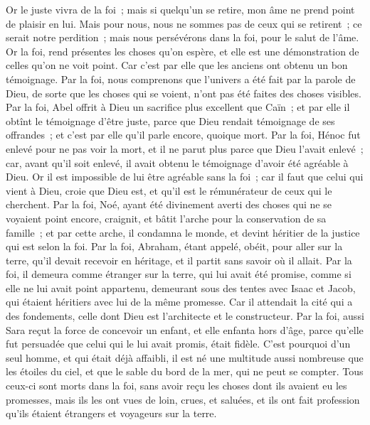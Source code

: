 \begin{multicols}{2}
Or le juste vivra de la foi~; mais si quelqu'un se retire, mon âme ne prend point de plaisir en lui.
Mais pour nous, nous ne sommes pas de ceux qui se retirent~; ce serait notre perdition~; mais nous persévérons dans la foi, pour le salut de l'âme.
\VerseOne{}Or la foi, rend présentes les choses qu'on espère, et elle est une démonstration de celles qu'on ne voit point.
Car c'est par elle que les anciens ont obtenu un bon témoignage.
Par la foi, nous comprenons que l'univers a été fait par la parole de Dieu, de sorte que les choses qui se voient, n'ont pas été faites des choses visibles.
Par la foi, Abel offrit à Dieu un sacrifice plus excellent que Caïn~; et par elle il obtînt le témoignage d'être juste, parce que Dieu rendait témoignage de ses offrandes~; et c'est par elle qu'il parle encore, quoique mort.
Par la foi, Hénoc fut enlevé pour ne pas voir la mort, et il ne parut plus parce que Dieu l'avait enlevé~; car, avant qu'il soit enlevé, il avait obtenu le témoignage d'avoir été agréable à Dieu.
Or il est impossible de lui être agréable sans la foi~; car il faut que celui qui vient à Dieu, croie que Dieu est, et qu'il est le rémunérateur de ceux qui le cherchent.
Par la foi, Noé, ayant été divinement averti des choses qui ne se voyaient point encore, craignit, et bâtit l'arche pour la conservation de sa famille~; et par cette arche, il condamna le monde, et devint héritier de la justice qui est selon la foi.
Par la foi, Abraham, étant appelé, obéit, pour aller sur la terre, qu'il devait recevoir en héritage, et il partit sans savoir où il allait.
Par la foi, il demeura comme étranger sur la terre, qui lui avait été promise, comme si elle ne lui avait point appartenu, demeurant sous des tentes avec Isaac et Jacob, qui étaient héritiers avec lui de la même promesse.
Car il attendait la cité qui a des fondements, celle dont Dieu est l'architecte et le constructeur.
Par la foi, aussi Sara reçut la force de concevoir un enfant, et elle enfanta hors d'âge, parce qu'elle fut persuadée que celui qui le lui avait promis, était fidèle.
C'est pourquoi d'un seul homme, et qui était déjà affaibli, il est né une multitude aussi nombreuse que les étoiles du ciel, et que le sable du bord de la mer, qui ne peut se compter.
Tous ceux-ci sont morts dans la foi, sans avoir reçu les choses dont ils avaient eu les promesses, mais ils les ont vues de loin, crues, et saluées, et ils ont fait profession qu'ils étaient étrangers et voyageurs sur la terre.

\end{multicols}
